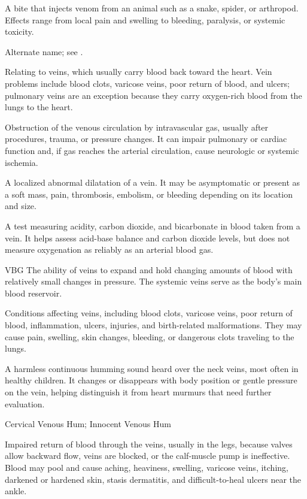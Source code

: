  A bite that injects venom from an animal such as a snake, spider, or arthropod. Effects range from local
pain and swelling to bleeding, paralysis, or systemic toxicity.

 Alternate name; see .

 Relating to veins, which usually carry blood back toward the heart. Vein problems include blood clots, varicose veins, poor return of blood, and ulcers; pulmonary veins are an exception because they carry oxygen-rich blood from the lungs to the heart.

 Obstruction of the venous circulation by intravascular gas, usually after procedures, trauma, or pressure changes. It can impair pulmonary or cardiac function and, if gas reaches the arterial circulation, cause neurologic or systemic ischemia.

 A localized abnormal dilatation of a vein. It may be asymptomatic or present as a soft mass, pain, thrombosis, embolism, or bleeding depending on its location and size.

 A test measuring acidity, carbon dioxide, and bicarbonate in blood taken from a vein. It helps assess acid-base balance and carbon dioxide levels, but does not measure oxygenation as reliably as an arterial blood gas.

\synonyms
VBG
 The ability of veins to expand and hold changing amounts of blood with relatively small changes in pressure. The systemic veins serve as the body's main blood reservoir.

 Conditions affecting veins, including blood clots, varicose veins, poor return of blood, inflammation, ulcers, injuries, and birth-related malformations. They may cause pain, swelling, skin changes, bleeding, or dangerous clots traveling to the lungs.

 A harmless continuous humming sound heard over the neck veins, most often in healthy children. It changes or disappears with body position or gentle pressure on the vein, helping distinguish it from heart murmurs that need further evaluation.

\synonyms
Cervical Venous Hum; Innocent Venous Hum

 Impaired return of blood through the veins, usually in the legs, because valves allow backward flow, veins are blocked, or the calf-muscle pump is ineffective. Blood may pool and cause aching, heaviness, swelling, varicose veins, itching, darkened or hardened skin, stasis dermatitis, and difficult-to-heal ulcers near the ankle.

